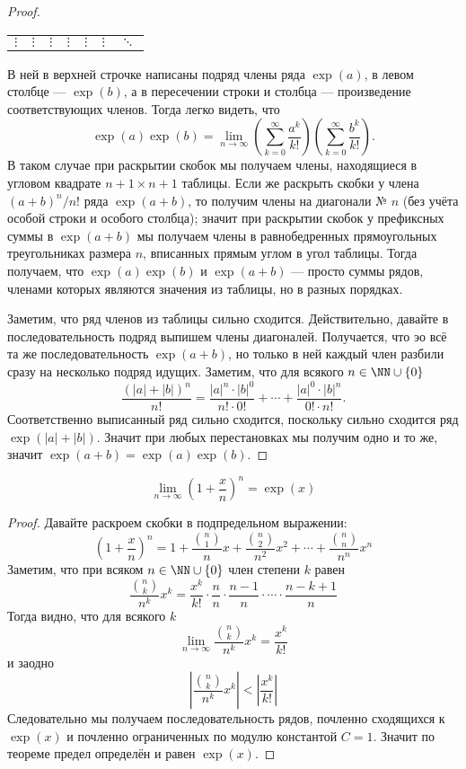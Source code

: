 \documentclass[12pt,a4paper]{article}
\begin{document}
\begin{proof}
\begin{table}[H]
\begin{tabular}{c||c|c|c|c|c|c}
                \hline
                $\vdots$ & $\vdots$ & $\vdots$ & $\vdots$ & $\vdots$ & $\vdots$ & $\ddots$\\
            \end{tabular}
        \end{table}
        В ней в верхней строчке написаны подряд члены ряда $\exp(a)$, в левом столбце --- $\exp(b)$, а в пересечении строки и столбца --- произведение соответствующих членов. Тогда легко видеть, что
        \[\exp(a)\exp(b) = \lim_{n \to \infty} \left(\sum_{k=0}^\infty \frac{a^k}{k!}\right)\left(\sum_{k=0}^\infty \frac{b^k}{k!}\right).\]
        В таком случае при раскрытии скобок мы получаем члены, находящиеся в угловом квадрате $n+1 \times n+1$ таблицы. Если же раскрыть скобки у члена $(a+b)^n/n!$ ряда $\exp(a+b)$, то получим члены на диагонали № $n$ (без учёта особой строки и особого столбца); значит при раскрытии скобок у префиксных суммы в $\exp(a+b)$ мы получаем члены в равнобедренных прямоугольных треугольниках размера $n$, вписанных прямым углом в угол таблицы. Тогда получаем, что $\exp(a)\exp(b)$ и $\exp(a+b)$ --- просто суммы рядов, членами которых являются значения из таблицы, но в разных порядках.

        Заметим, что ряд членов из таблицы сильно сходится. Действительно, давайте в последовательность подряд выпишем члены диагоналей. Получается, что эо всё та же последовательность $\exp(a+b)$, но только в ней каждый член разбили сразу на несколько подряд идущих. Заметим, что для всякого $n \in \NN \cup \{0\}$
        \[\frac{(|a|+|b|)^n}{n!} = \frac{|a|^n \cdot |b|^0}{n! \cdot 0!} + \cdots + \frac{|a|^0 \cdot |b|^n}{0! \cdot n!}.\]
        Соответственно выписанный ряд сильно сходится, поскольку сильно сходится ряд $\exp(|a| + |b|)$. Значит при любых перестановках мы получим одно и то же, значит $\exp(a + b) = \exp(a) \exp(b)$.
    \end{proof}

    \begin{statement}
        \[\lim_{n \to \infty} \left(1 + \frac{x}{n}\right)^n = \exp(x)\]
    \end{statement}

    \begin{proof}
        Давайте раскроем скобки в подпредельном выражении:
        \[
            \left(1 + \frac{x}{n}\right)^n
            = 1 + \frac{\binom{n}{1}}{n}x + \frac{\binom{n}{2}}{n^2}x^2 + \cdots + \frac{\binom{n}{n}}{n^n}x^n
        \]
        Заметим, что при всяком $n \in \NN \cup \{0\}$ член степени $k$ равен
        \[\frac{\binom{n}{k}}{n^k}x^k = \frac{x^k}{k!} \cdot \frac{n}{n} \cdot \frac{n-1}{n} \cdot \cdots \cdot \frac{n-k+1}{n}\]
        Тогда видно, что для всякого $k$
        \[\lim_{n \to \infty} \frac{\binom{n}{k}}{n^k}x^k = \frac{x^k}{k!}\]
        и заодно
        \[\left|\frac{\binom{n}{k}}{n^k}x^k\right| < \left|\frac{x^k}{k!}\right|\]
        Следовательно мы получаем последовательность рядов, почленно сходящихся к $\exp(x)$ и почленно ограниченных по модулю константой $C=1$. Значит по теореме предел определён и равен $\exp(x)$.
    \end{proof}
\end{document}
